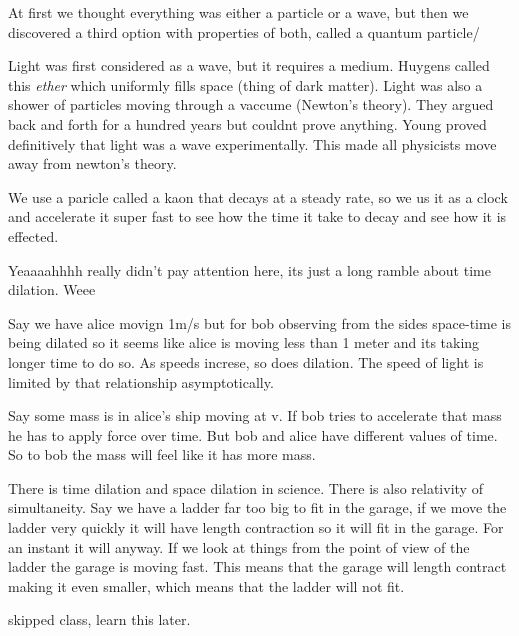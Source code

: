 \documentclass{article}
\begin{document}
At first we thought everything was either a particle or a wave, but then we discovered a third option with properties of both, called a quantum particle/

Light was first considered as a wave, but it requires a medium. Huygens called this \emph{ether} which uniformly fills space (thing of dark matter). Light was also a shower of particles moving through a vaccume (Newton's theory). They argued back and forth for a hundred years but couldnt prove anything. Young proved definitively that light was a wave experimentally. This made all physicists move away from newton's theory.

We use a paricle called a kaon that decays at a steady rate, so we us it as a clock and accelerate it super fast to see how the time it take to decay and see how it is effected.


Yeaaaahhhh really didn't pay attention here, its just a long ramble about time dilation. Weee




Say we have alice movign 1m/s but for bob observing from the sides space-time is being dilated so it seems like alice is moving less than 1 meter and its taking longer time to do so. As speeds increse, so does dilation. The speed of light is limited by that relationship asymptotically.

Say some mass is in alice's ship moving at v. If bob tries to accelerate that mass he has to apply force over time. But bob and alice have different values of time. So to bob the mass will feel like it has more mass.

There is time dilation and space dilation in science. There is also relativity of simultaneity. Say we have a ladder far too big to fit in the garage, if we move the ladder very quickly it will have length contraction so it will fit in the garage. For an instant it will anyway. If we look at things from the point of view of the ladder the garage is moving fast. This means that the garage will length contract making it even smaller, which means that the ladder will not fit.


skipped class, learn this later.
\end{document}
